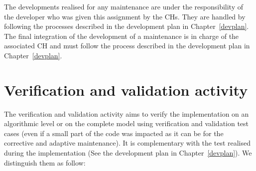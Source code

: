 The developments realised for any maintenance are under the responsibility of
the developer who was given this assignment by the CHs. They are handled by
following the processes described in the development plan in
Chapter~\ref{devplan}.\\

The final integration of the development of a maintenance is in charge of the
associated CH and must follow the process described in the development plan in
Chapter~\ref{devplan}.

\section{Verification and validation activity}
\label{vv}
The verification and validation activity aims to verify the implementation on
an algorithmic level or on the complete model using verification and validation
test cases (even if a small part of the code was impacted as it can be for the
corrective and adaptive maintenance). It is complementary with the test
realised during the implementation (See the development plan in
Chapter~\ref{devplan}). We distinguish them as follow:
